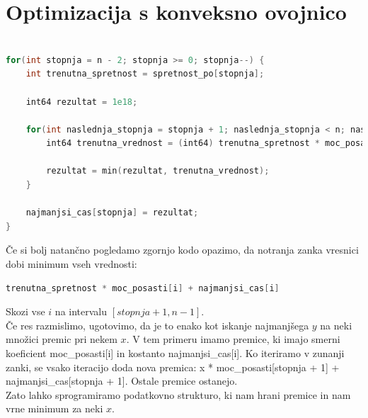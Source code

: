 \section{Optimizacija s konveksno ovojnico}\label{sec:optimizacija-s-konveksno-ovojnico}

\begin{lstlisting}[label={lst:code4}, language=C++]

for(int stopnja = n - 2; stopnja >= 0; stopnja--) {
    int trenutna_spretnost = spretnost_po[stopnja];

    int64 rezultat = 1e18;

    for(int naslednja_stopnja = stopnja + 1; naslednja_stopnja < n; naslednja_stopnja++) {
        int64 trenutna_vrednost = (int64) trenutna_spretnost * moc_posasti[naslednja_stopnja] + najmanjsi_cas[naslednja_stopnja];

        rezultat = min(rezultat, trenutna_vrednost);
    }

    najmanjsi_cas[stopnja] = rezultat;
}

\end{lstlisting}

Če si bolj natančno pogledamo zgornjo kodo opazimo, da notranja zanka vresnici dobi minimum vseh vrednosti:

\begin{lstlisting}[label={lst:code6}, language=C++]
    trenutna_spretnost * moc_posasti[i] + najmanjsi_cas[i]
\end{lstlisting}

Skozi vse $i$ na intervalu $[stopnja+1, n-1]$.
\\
Če res razmislimo, ugotovimo, da je to enako kot iskanje najmanjšega $y$ na neki množici premic pri nekem $x$.
V tem primeru imamo premice, ki imajo smerni koeficient moc\_posasti[i] in kostanto najmanjsi\_cas[i].
Ko iteriramo v zunanji zanki, se vsako iteracijo doda nova premica: x * moc\_posasti[stopnja + 1] + najmanjsi\_cas[stopnja + 1].
Ostale premice ostanejo.
\\
Zato lahko sprogramiramo podatkovno strukturo, ki nam hrani premice in nam vrne minimum za neki $x$.

